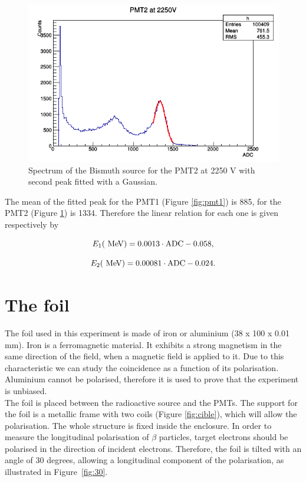 \documentclass[10pt,swedish, openany]{book}
\def\MeV{\ifmmode {\mathrm{\ Me\kern -0.1em V}}\else
                   \textrm{Ge\kern -0.1em V}\fi}%
\begin{document}
\begin{figure}[H]
\includegraphics[scale=0.5]{PMT2_2250V.png}
\centering
\caption{Spectrum of the Bismuth source for the PMT2 at 2250 V with second peak fitted with a Gaussian.}
\label{fig:pmt2}
\end{figure}

The mean of the fitted peak for the PMT1 (Figure \ref{fig:pmt1}) is 885, for the PMT2 (Figure \ref{fig:pmt2}) is 1334. Therefore the linear relation for each one is given respectively by

\begin{equation}
    E_1 (\MeV) = 0.0013 \cdot {\rm ADC} - 0.058,
\end{equation}

\begin{equation}
    E_2 (\MeV) = 0.00081 \cdot {\rm ADC} - 0.024.
\end{equation}

\newpage

\section{The foil}

The foil used in this experiment is made of iron or aluminium (38 x 100 x 0.01 mm). Iron is a ferromagnetic material. It exhibits a strong magnetism in the same direction of the field, when a magnetic field is applied to it. Due to this characteristic we can study the coincidence as a function of its polarisation. Aluminium cannot be polarised, therefore it is used to prove that the experiment is unbiased.\\

The foil is placed between the radioactive source and the PMTs. The support for the foil is a metallic frame with two coils (Figure \ref{fig:cible}), which will allow the polarisation. The whole structure is fixed inside the enclosure. In order to measure the longitudinal polarisation of $\beta$ particles, target electrons should be polarised in the direction of incident electrons. Therefore, the foil is tilted with an angle of 30 degrees, allowing a longitudinal component of the polarisation, as illustrated in Figure~\ref{fig:30}.
\end{document}
